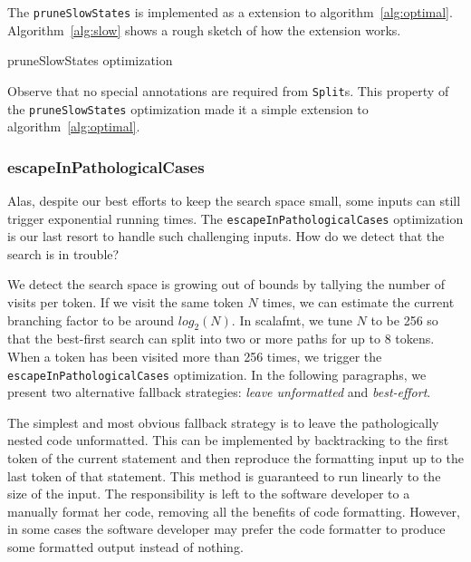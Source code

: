 The \texttt{pruneSlowStates} is implemented as a extension to algorithm~\ref{alg:optimal}.
Algorithm~\ref{alg:slow} shows a rough sketch of how the extension works.
\begin{algorithm}[H]
  \caption{pruneSlowStates optimization}\label{alg:slow}
  
\end{algorithm}
Observe that no special annotations are required from \texttt{Split}s.
This property of the \texttt{pruneSlowStates} optimization made it a simple extension to algorithm~\ref{alg:optimal}.

\subsubsection{escapeInPathologicalCases}\label{sec:escape}
Alas, despite our best efforts to keep the search space small, some inputs can still trigger exponential running times.
The \texttt{escapeInPathologicalCases} optimization is our last resort to handle such challenging inputs.
How do we detect that the search is in trouble?

We detect the search space is growing out of bounds by tallying the number of visits per token.
If we visit the same token $N$ times, we can estimate the current branching factor to be around $log_2(N)$.
In scalafmt, we tune $N$ to be 256 so that the best-first search can split into two or more paths for up to 8 tokens.
When a token has been visited more than 256 times, we trigger the \texttt{escapeInPathologicalCases} optimization.
In the following paragraphs, we present two alternative fallback strategies: \emph{leave unformatted} and \emph{best-effort}.

The simplest and most obvious fallback strategy is to leave the pathologically nested code unformatted.
This can be implemented by backtracking to the first token of the current statement and then reproduce the formatting input up to the last token of that statement.
This method is guaranteed to run linearly to the size of the input.
The responsibility is left to the software developer to a manually format her code, removing all the benefits of code formatting.
However, in some cases the software developer may prefer the code formatter to produce some formatted output instead of nothing.

